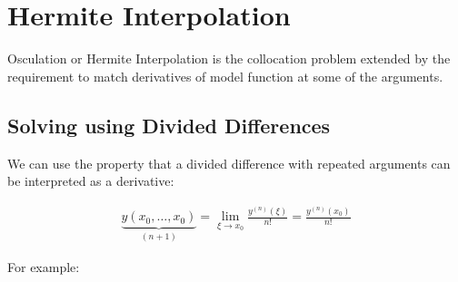 \section{Hermite Interpolation}

Osculation or Hermite Interpolation is the collocation problem extended by the requirement to match
derivatives of model function at some of the arguments.

\subsection{Solving using Divided Differences}

We can use the property that a divided difference with repeated arguments can be interpreted as a derivative:

\begin{align*}
	\underbrace{y(x_0,\ldots,x_0)}_{(n+1)}=\lim_{\xi\to x_0}\frac{y^{(n)}(\xi)}{n!}=\frac{y^{(n)}(x_0)}{n!}
\end{align*}

For example:


